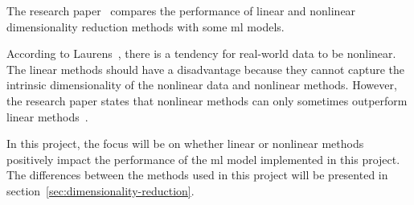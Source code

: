 The research paper~\cite{dimensionality-reduction-comparative-review} compares the performance of linear and nonlinear dimensionality reduction methods with some \gls{ml} models.

According to Laurens~\cite{dimensionality-reduction-comparative-review}, there is a tendency for real-world data to be nonlinear. The linear methods should have a disadvantage because they cannot capture the intrinsic dimensionality of the nonlinear data and nonlinear methods. However, the research paper states that nonlinear methods can only sometimes outperform linear methods~\cite{dimensionality-reduction-comparative-review}.

In this project, the focus will be on whether linear or nonlinear methods positively impact the performance of the \gls{ml} model implemented in this project. The differences between the methods used in this project will be presented in section~\ref{sec:dimensionality-reduction}.




